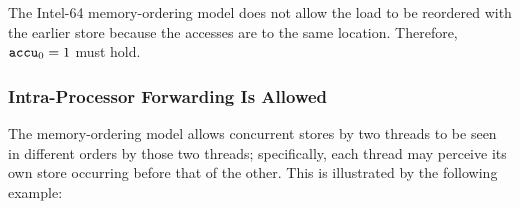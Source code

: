 \begin{table}[!hbt]
\noindent{}
\caption{Loads Are not Reordered with Older Stores to the Same Location \cite[Example 8-4]{ref:Intel}}
\label{tbl:litmus:intel:4}
\end{table}

\noindent
The Intel-64 memory-ordering model does not allow the load to be reordered with the earlier store because the accesses are to the same location.
Therefore, $\texttt{accu}_0 = 1$ must hold.

\newpage

\subsubsection*{Intra-Processor Forwarding Is Allowed}

The memory-ordering model allows concurrent stores by two threads to be seen in different orders by those two threads; specifically, each thread may perceive its own store occurring before that of the other.
This is illustrated by the following example:

